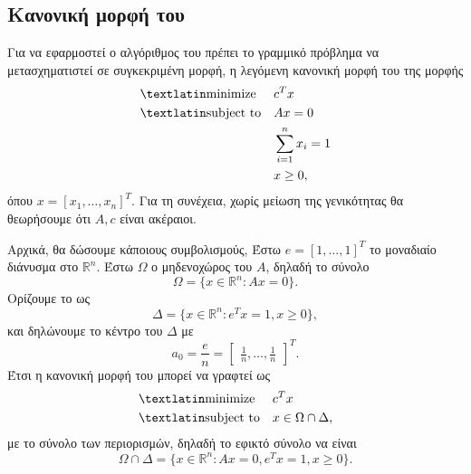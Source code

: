 \subsection{Κανονική μορφή του }
Για να εφαρμοστεί ο αλγόριθμος του  πρέπει το γραμμικό πρόβλημα να
μετασχηματιστεί σε συγκεκριμένη μορφή, η λεγόμενη κανονική μορφή του
 της μορφής
\begin{equation*}
    \begin{aligned}
        & {\text{\tl{minimize}}}
        & & c^T x \\
        & \text{\tl{subject to}}
        & & A x = 0 \\
        &&& \sum_{i=1}^n x_i = 1 \\
        &&& x \ge 0,
    \end{aligned}
\end{equation*}
όπου \( x = [x_1, \dots, x_n]^T \). Για τη συνέχεια, χωρίς μείωση της
γενικότητας θα θεωρήσουμε ότι \( A, c\) είναι ακέραιοι.

Αρχικά, θα δώσουμε κάποιους συμβολισμούς, Έστω \( e = [1, \dots, 1]^T \) το
μοναδιαίο διάνυσμα στο \( \mathbb{R}^n \). Έστω \( \Omega \) ο μηδενοχώρος του
\(A\), δηλαδή το σύνολο
\begin{equation*}
    \Omega = \{ x \in \mathbb{R}^n: Ax = 0\}.
\end{equation*}
Ορίζουμε το  ως
\begin{equation*}
    \Delta = \{ x \in \mathbb{R}^n: e^Tx = 1, x \geq 0\},
\end{equation*}
και δηλώνουμε το κέντρο του  \(\Delta \) με
\begin{equation*}
    a_0 = \frac{e}{n} = \begin{bmatrix}
        \frac{1}{n}, \dots, \frac{1}{n}
    \end{bmatrix}^T.
\end{equation*}
Έτσι η κανονική μορφή του  μπορεί να γραφτεί ως
\begin{equation}\label{eq:ip_kar_can}
    \begin{aligned}
        & {\text{\tl{minimize}}}
        & & c^T x \\
        & \text{\tl{subject to}}
        & & x \in \Omega \cap \Delta,
    \end{aligned}
\end{equation}
με το σύνολο των περιορισμών, δηλαδή το εφικτό σύνολο να είναι
\begin{equation*}
    \Omega \cap \Delta = \{ x \in \mathbb{R}^n: Ax = 0, e^Tx = 1, x \geq 0 \}.
\end{equation*}


